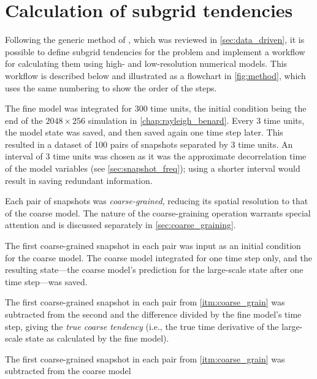 \documentclass[../main.tex]{subfiles}
\begin{document}
\section{Calculation of subgrid tendencies}
\label{sec:calculation}
Following the generic method of \textcite{brajard2021}, which was reviewed in
\cref{sec:data_driven}, it is possible to define subgrid tendencies for the
\rb{} problem and implement a workflow for calculating them using high- and
low-resolution numerical models. This workflow is described below and
illustrated as a flowchart in \cref{fig:method}, which uses the same numbering
to show the order of the steps.
\begin{steps}
    \item\label{itm:fine_model} The fine model was integrated for 300
        time units, the initial condition being the end of the $2048 \times
        256$ simulation in \cref{chap:rayleigh_benard}. Every 3 time units,
        the model state was saved, and then saved again one time step later.
        This resulted in a dataset of 100 pairs of snapshots separated by 3
        time units. An interval of 3 time units was chosen as it was the
        approximate decorrelation time of the model variables (see
        \cref{sec:snapshot_freq}); using a shorter interval would result in
        saving redundant information.
    \item\label{itm:coarse_grain} Each pair of snapshots was
        \emph{coarse-grained}, reducing its spatial resolution to that of the
        coarse model. The nature of the coarse-graining operation warrants
        special attention and is discussed separately in
        \cref{sec:coarse_graining}.
    \item\label{itm:coarse_model} The first coarse-grained snapshot in
        each pair was input as an initial condition for the coarse model. The
        coarse model integrated for one time step only, and the resulting
        state---the coarse model's prediction for the large-scale state after
        one time step---was saved.
    \item\label{itm:true_tend} The first coarse-grained snapshot in each
        pair from \cref{itm:coarse_grain} was subtracted from the second
        and the difference divided by the fine model's time step, giving the
        \emph{true coarse tendency} (i.e., the true time derivative of the
        large-scale state as calculated by the fine model).
    \item\label{itm:pred_tend} The first coarse-grained snapshot in each
        pair from \cref{itm:coarse_grain} was subtracted from the coarse model

\end{steps}
\end{document}

